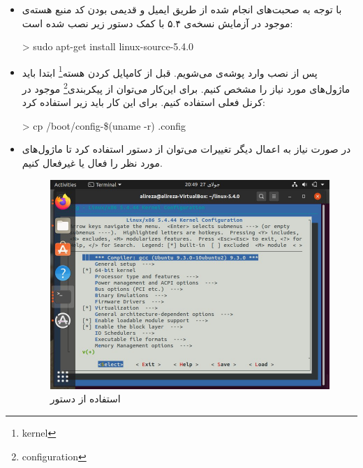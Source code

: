 
\begin{itemize}
	\item
		 با توجه به صحبت‌های انجام شده از طریق ایمیل و قدیمی بودن کد منبع هسته‌ی موجود در آزمایش نسخه‌ی ۵.۴ با کمک دستور زیر نصب شده است:
		
		\begin{code}
			> sudo apt-get install linux-source-5.4.0
		\end{code}

	\item
		 	پس از نصب وارد پوشه‌ی  می‌شویم. قبل از کامپایل کردن هسته\footnote{kernel} ابتدا باید ماژول‌های مورد نیاز را مشخص کنیم. برای این‌کار می‌توان از پیکربندی\footnote{configuration} موجود در کرنل فعلی استفاده کنیم. برای این کار باید زیر استفاده کرد:
		
		\begin{code}
			> cp /boot/config-\$(uname -r) .config
		\end{code}	
	\item
		در صورت نیاز به اعمال دیگر تغییرات می‌توان از دستور  استفاده کرد تا ماژول‌های مورد نظر را فعال یا غیرفعال کنیم.
	
	\begin{figure}[!h]
		\centering
		\includegraphics[scale=0.4]{d2.jpeg}
		\caption{استفاده از دستور }
	\end{figure}
	

\end{itemize}
